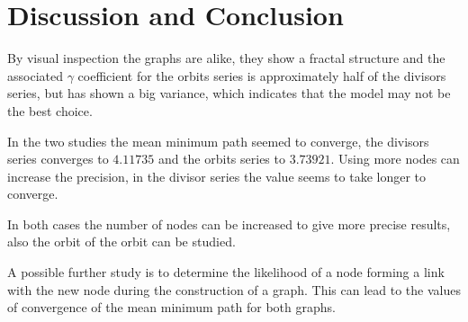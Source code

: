 \documentclass[a4paper,12pt]{article}
\begin{document}
\section{Discussion and Conclusion}

By visual inspection the graphs are alike, they show a fractal structure and
the associated $\gamma$ coefficient for the orbits series is approximately
half of the divisors series, but has shown a big variance, which indicates
that the model may not be the best choice.

In the two studies the mean minimum path seemed to converge, the divisors
series converges to $4.11735$ and the orbits series to $3.73921$. Using more
nodes can increase the precision, in the divisor series the value seems to take
longer to converge.

In both cases the number of nodes can be increased to give more precise
results, also the orbit of the orbit can be studied.

A possible further study is to determine the likelihood of a node forming
a link with the new node during the construction of a graph. This can
lead to the values of convergence of the mean minimum path for both graphs.
\end{document}
